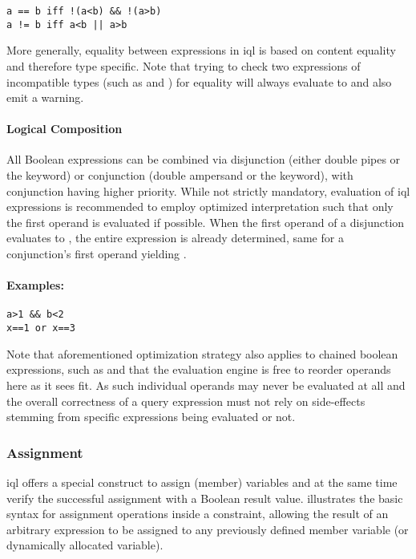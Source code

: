 \documentclass[11pt,a4paper]{article}
\begin{document}
\begin{Verbatim}[samepage=true]
a == b iff !(a<b) && !(a>b)
a != b iff a<b || a>b
\end{Verbatim}

\noindent More generally, equality between expressions in \ac{iql} is based on content equality and therefore type specific.
Note that trying to check two expressions of incompatible types (such as  and ) for equality will always evaluate to  and also emit a warning. 

\paragraph{Logical Composition}
\label{sec:logical-composition}

All Boolean expressions can be combined via disjunction (either double pipes \lit{||} or the  keyword) or conjunction (double ampersand \lit{\&\&} or the  keyword), with conjunction having higher priority. 
While not strictly mandatory, evaluation of \ac{iql} expressions is recommended to employ optimized interpretation such that only the first operand is evaluated if possible. 
When the first operand of a disjunction evaluates to , the entire expression is already determined, same for a conjunction's first operand yielding .

\paragraph{Examples:}
\begin{Verbatim}[samepage=true]
a>1 && b<2
x==1 or x==3
\end{Verbatim}

Note that aforementioned optimization strategy also applies to chained boolean expressions, such as  and that the evaluation engine is free to reorder operands here as it sees fit.
As such individual operands may never be evaluated at all and the overall correctness of a query expression must not rely on side-effects stemming from specific expressions being evaluated or not.

\subsubsection{Assignment}
\label{sec:assignment}

\ac{iql} offers a special construct to assign (member) variables and at the same time verify the successful assignment with a Boolean result value. 
 illustrates the basic syntax for assignment operations inside a constraint, allowing the result of an arbitrary expression to be assigned to any previously defined member variable (or dynamically allocated variable).
\end{document}
